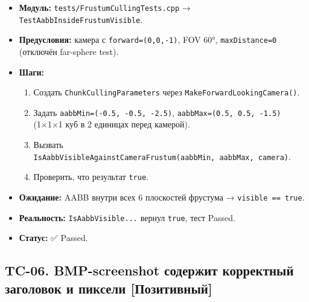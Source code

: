 \begin{itemize}
\tightlist
\item
  \textbf{Модуль:} \texttt{tests/FrustumCullingTests.cpp} → \texttt{TestAabbInsideFrustumVisible}.
\item
  \textbf{Предусловия:} камера с \texttt{forward=(0,0,-1)}, FOV 60°, \texttt{maxDistance=0} (отключён far-sphere test).
\item
  \textbf{Шаги:}

  \begin{enumerate}
  \def\labelenumi{\arabic{enumi}.}
  \tightlist
  \item
    Создать \texttt{ChunkCullingParameters} через \texttt{MakeForwardLookingCamera()}.
  \item
    Задать \texttt{aabbMin=(-0.5,\ -0.5,\ -2.5)}, \texttt{aabbMax=(0.5,\ 0.5,\ -1.5)} (1×1×1 куб в 2 единицах перед камерой).
  \item
    Вызвать \texttt{IsAabbVisibleAgainstCameraFrustum(aabbMin,\ aabbMax,\ camera)}.
  \item
    Проверить, что результат \texttt{true}.
  \end{enumerate}
\item
  \textbf{Ожидание:} AABB внутри всех 6 плоскостей фрустума → \texttt{visible\ ==\ true}.
\item
  \textbf{Реальность:} \texttt{IsAabbVisible...} вернул \texttt{true}, тест Passed.
\item
  \textbf{Статус:} ✅ Passed.
\end{itemize}

\subsection{TC-06. BMP-screenshot содержит корректный заголовок и пиксели {[}Позитивный{]}}\label{KT-2.2_Test_Report-tc-06-bmp-screenshot-ux441ux43eux434ux435ux440ux436ux438ux442-ux43aux43eux440ux440ux435ux43aux442ux43dux44bux439-ux437ux430ux433ux43eux43bux43eux432ux43eux43a-ux438-ux43fux438ux43aux441ux435ux43bux438-ux43fux43eux437ux438ux442ux438ux432ux43dux44bux439}

